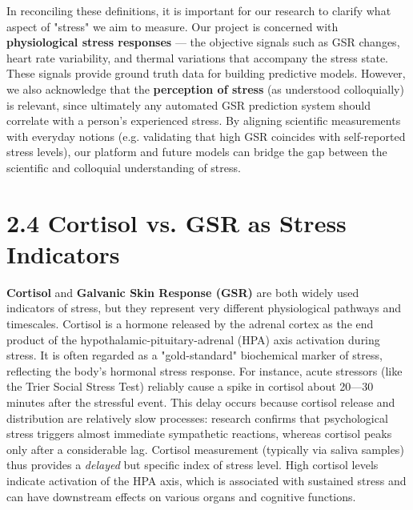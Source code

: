 \documentclass[11pt,a4paper]{report}
\begin{document}
In reconciling these definitions, it is important for our research to
clarify what aspect of "stress" we aim to measure. Our project is
concerned with \textbf{physiological stress responses} --- the objective
signals such as GSR changes, heart rate variability, and thermal
variations that accompany the stress state. These signals provide ground
truth data for building predictive models. However, we also acknowledge
that the \textbf{perception of stress} (as understood colloquially) is
relevant, since ultimately any automated GSR prediction system should
correlate with a person's experienced stress. By aligning scientific
measurements with everyday notions (e.g. validating that high GSR
coincides with self-reported stress levels), our platform and future
models can bridge the gap between the scientific and colloquial
understanding of stress.

\section{2.4 Cortisol vs. GSR as Stress Indicators}

\textbf{Cortisol} and \textbf{Galvanic Skin Response (GSR)} are both widely used
indicators of stress, but they represent very different physiological
pathways and timescales. Cortisol is a hormone released by the adrenal
cortex as the end product of the hypothalamic-pituitary-adrenal (HPA)
axis activation during stress. It is often regarded as a "gold-standard"
biochemical marker of stress, reflecting the body's hormonal stress
response. For instance, acute stressors (like the Trier Social Stress
Test) reliably cause a spike in cortisol about 20---30 minutes after the
stressful
event\cite{CortisolStressIndicator2020}.
This delay occurs because cortisol release and distribution are
relatively slow processes: research confirms that psychological stress
triggers almost immediate sympathetic reactions, whereas cortisol peaks
only after a considerable
lag\cite{CortisolStressIndicator2020}.
Cortisol measurement (typically via saliva samples) thus provides a
\textit{delayed} but specific index of stress level. High cortisol levels
indicate activation of the HPA axis, which is associated with sustained
stress and can have downstream effects on various organs and cognitive
functions.
\end{document}
